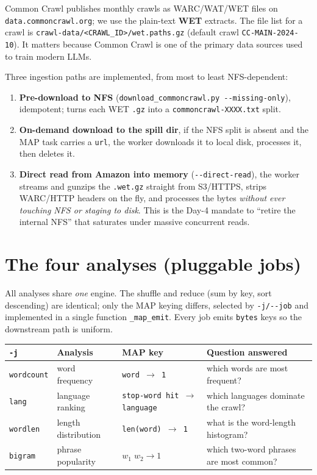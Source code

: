 \documentclass[11pt,a4paper]{article}
\newcommand{\code}[1]{\texttt{\small #1}}
\begin{document}
Common Crawl publishes monthly crawls as WARC/WAT/WET files on
\code{data.commoncrawl.org}; we use the plain-text \textbf{WET} extracts. The
file list for a crawl is \code{crawl-data/<CRAWL\_ID>/wet.paths.gz}
(default crawl \code{CC-MAIN-2024-10}). It matters because Common Crawl is one of
the primary data sources used to train modern LLMs.

Three ingestion paths are implemented, from most to least NFS-dependent:

\begin{enumerate}
\item \textbf{Pre-download to NFS} (\code{download\_commoncrawl.py
-{}-missing-only}), idempotent; turns each WET \code{.gz} into a
\code{commoncrawl-XXXX.txt} split.
\item \textbf{On-demand download to the spill dir}, if the NFS split is absent
and the MAP task carries a \code{url}, the worker downloads it to local disk,
processes it, then deletes it.
\item \textbf{Direct read from Amazon into memory} (\code{-{}-direct-read}),
the worker streams and gunzips the \code{.wet.gz} straight from S3/HTTPS,
strips WARC/HTTP headers on the fly, and processes the bytes \emph{without ever
touching NFS or staging to disk}. This is the Day-4 mandate to ``retire the
internal NFS'' that saturates under massive concurrent reads.
\end{enumerate}

\section{The four analyses (pluggable jobs)}\label{sec:jobs}

All analyses share \emph{one} engine. The shuffle and reduce (sum by key, sort
descending) are identical; only the MAP keying differs, selected by
\code{-j/-{}-job} and implemented in a single function \code{\_map\_emit}. Every
job emits \code{bytes} keys so the downstream path is uniform.

\begin{table}[H]
\centering
\small
\renewcommand{\arraystretch}{1.3}
\begin{tabularx}{\textwidth}{@{}lll X@{}}
\toprule
\code{-j} & \textbf{Analysis} & \textbf{MAP key} & \textbf{Question answered}\\
\midrule
\code{wordcount} & word frequency & \code{word $\to$ 1} & which words are most frequent?\\
\code{lang} & language ranking & \code{stop-word hit $\to$ language} & which languages dominate the crawl?\\
\code{wordlen} & length distribution & \code{len(word) $\to$ 1} & what is the word-length histogram?\\
\code{bigram} & phrase popularity & \code{$w_1\;w_2 \to 1$} & which two-word phrases are most common?\\
\bottomrule
\end{tabularx}
\end{table}
\end{document}

